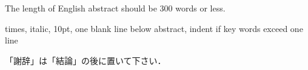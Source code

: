 \documentclass[dvipdfmx]{jjsce}
\begin{document}


\begin{abstract}
  要旨の長さは350字以内です．キーワードは5つ程度書いて下さい．
\end{abstract}
\begin{Eabstract}
  The length of English abstract should be 300 words or less.
\end{Eabstract}
\begin{keyword}
  times, italic, 10pt, one blank line below abstract, indent if key words exceed one line
\end{keyword}

\maketitle


% 

\Acknowledgment
「謝辞」は「結論」の後に置いて下さい．



\end{document}
